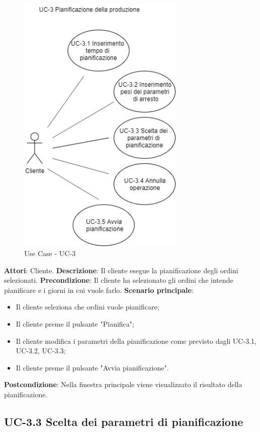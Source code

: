 \begin{figure}[H]
	\includegraphics[width=8cm]{immagini/UC1.png}
	\centering
	\caption{Use Case - UC-3}
\end{figure}

\textbf{Attori}: Cliente. \newline
\textbf{Descrizione}: Il cliente esegue la pianificazione degli ordini selezionati.\newline
\textbf{Precondizione}: Il cliente ha selezionato gli ordini che intende pianificare e i giorni in cui vuole farlo.\newline
\textbf{Scenario principale}: \begin{itemize}
    \item Il cliente seleziona che ordini vuole pianificare;
    \item Il cliente preme il pulsante "Pianifica";
    \item Il cliente modifica i parametri della pianificazione come previsto dagli UC-3.1, UC-3.2, UC-3.3;
    \item Il cliente preme il pulsante "Avvia pianificazione".
\end{itemize}

\textbf{Postcondizione}: Nella finestra principale viene visualizzato il risultato della pianificazione.


\subsection*{UC-3.3 Scelta dei parametri di pianificazione}

